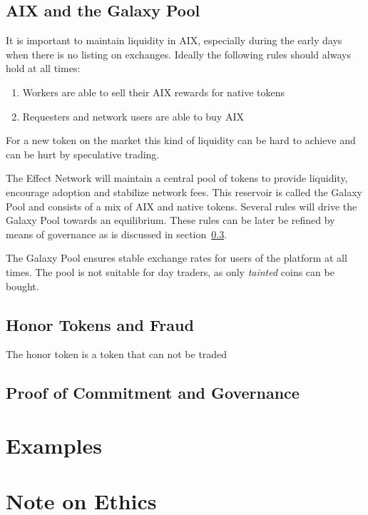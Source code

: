 \documentclass{article}
\begin{document}
\subsection{AIX and the Galaxy Pool}
It is important to maintain liquidity in AIX, especially during the
early days when there is no listing on exchanges. Ideally the
following rules should always hold at all times:

\begin{enumerate}
\item Workers are able to sell their AIX rewards for native tokens
\item Requesters and network users are able to buy AIX
\end{enumerate}

For a new token on the market this kind of liquidity can be hard to
achieve and can be hurt by speculative trading.

The Effect Network will maintain a central pool of tokens to provide
liquidity, encourage adoption and stabilize network fees. This
reservoir is called the Galaxy Pool and consists of a mix of AIX and
native tokens. Several rules will drive the Galaxy Pool towards an
equilibrium. These rules can be later be refined by means of
governance as is discussed in section~\ref{sec:governance}.

The Galaxy Pool ensures stable exchange rates for users of the
platform at all times. The pool is not suitable for day traders, as
only \emph{tainted} coins can be bought.

\subsection{Honor Tokens and Fraud}
\label{sec:fraud}
The honor token is a token that can not be traded

\subsection{Proof of Commitment and Governance}
\label{sec:governance}

\section{Examples}

\section{Note on Ethics}
\end{document}
